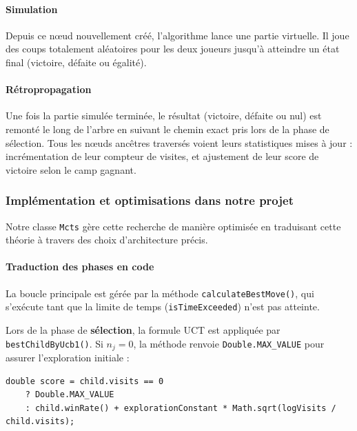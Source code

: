 \documentclass[a4paper]{article}
\begin{document}
\paragraph{Simulation}
Depuis ce nœud nouvellement créé, l'algorithme lance une partie virtuelle. Il joue des coups totalement aléatoires pour les deux 
joueurs jusqu'à atteindre un état final (victoire, défaite ou égalité).
\paragraph{Rétropropagation}
Une fois la partie simulée terminée, le résultat (victoire, défaite ou nul) est remonté le long de l'arbre en suivant
 le chemin exact pris lors de la phase de sélection. Tous les nœuds ancêtres traversés voient leurs statistiques mises à jour :
  incrémentation de leur compteur de visites, et ajustement de leur score de victoire selon le camp gagnant.



\subsubsection{Implémentation et optimisations dans notre projet}

Notre classe \texttt{Mcts} gère cette recherche de manière optimisée en traduisant cette théorie à travers des choix d'architecture précis.

\paragraph{Traduction des phases en code}
La boucle principale est gérée par la méthode \texttt{calculateBestMove()}, qui s'exécute tant que la limite de temps (\texttt{isTimeExceeded}) n'est pas atteinte. 

Lors de la phase de \textbf{sélection}, la formule UCT est appliquée par \texttt{bestChildByUcb1()}. Si $n_j = 0$, la méthode renvoie 
\texttt{Double.MAX\_VALUE} pour assurer l'exploration initiale :

\begin{verbatim}
double score = child.visits == 0
    ? Double.MAX_VALUE
    : child.winRate() + explorationConstant * Math.sqrt(logVisits / child.visits);
\end{verbatim}
\end{document}
